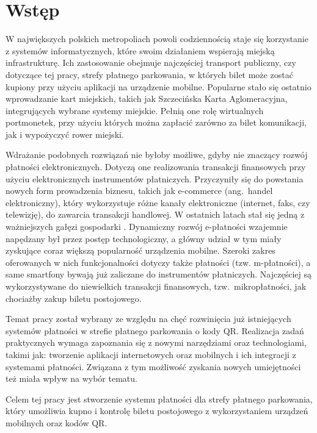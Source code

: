 \section*{Wstęp}

W największych polskich metropoliach powoli codziennością staje się korzystanie z systemów informatycznych, które swoim działaniem wspierają miejską infrastrukturę. Ich zastosowanie obejmuje
najczęściej transport publiczny, czy dotyczące tej pracy, strefy płatnego
parkowania, w których bilet może zostać kupiony przy użyciu aplikacji na urządzenie 
mobilne. Popularne stało się ostatnio wprowadzanie kart miejskich, takich jak 
Szczecińska Karta Aglomeracyjna, integrujących wybrane systemy miejskie. Pełnią 
one rolę wirtualnych portmonetek, przy użyciu których można zapłacić zarówno za 
bilet komunikacji, jak i wypożyczyć rower miejski. 

Wdrażanie podobnych rozwiązań nie byłoby możliwe, gdyby nie 
znaczący rozwój płatności elektronicznych. Dotyczą one 
realizowania transakcji finansowych przy użyciu elektronicznych instrumentów 
płatniczych. Przyczyniły się do powstania 
nowych form prowadzenia biznesu, takich jak e-commerce (ang.~handel elektroniczny), który wykorzystuje różne kanały elektroniczne (internet, faks, czy telewizję), do zawarcia transakcji handlowej. W ostatnich latach stał się jedną z ważniejszych gałęzi gospodarki 
\cite{barometr_radio}. Dynamiczny rozwój e-płatności 
wzajemnie napędzany był przez postęp technologiczny, a główny udział w tym miały 
zyskujące coraz większą popularność urządzenia mobilne. Szeroki zakres oferowanych w nich funkcjonalności 
dotyczy także płatności (tzw. m-płatności), a same smartfony bywają już 
zaliczane do instrumentów płatniczych. Najczęściej są wykorzystywane do 
niewielkich transakcji finansowych, tzw.~mikropłatności, jak chociażby zakup 
biletu postojowego.

Temat pracy został wybrany ze względu na chęć rozwinięcia już istniejących 
systemów płatności w strefie płatnego parkowania o kody QR. Realizacja zadań praktycznych wymaga zapoznania się 
z nowymi narzędziami oraz technologiami, takimi jak: tworzenie aplikacji 
internetowych oraz mobilnych i ich integracji z systemami płatności. Związana z 
tym możliwość zyskania nowych umiejętności też miała wpływ na wybór tematu.

Celem tej pracy jest stworzenie systemu płatności dla strefy płatnego 
parkowania, który umożliwia kupno i kontrolę biletu postojowego z 
wykorzystaniem urządzeń mobilnych oraz kodów QR.

